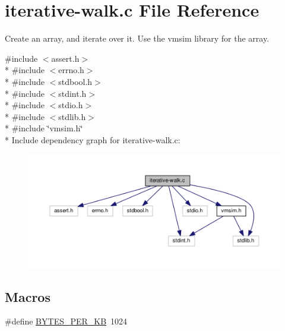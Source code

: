 \hypertarget{iterative-walk_8c}{\section{iterative-\/walk.c File Reference}
\label{iterative-walk_8c}
}


Create an array, and iterate over it. Use the {\ttfamily vmsim} library for the array.  


{\ttfamily \#include $<$assert.\+h$>$}\\*
{\ttfamily \#include $<$errno.\+h$>$}\\*
{\ttfamily \#include $<$stdbool.\+h$>$}\\*
{\ttfamily \#include $<$stdint.\+h$>$}\\*
{\ttfamily \#include $<$stdio.\+h$>$}\\*
{\ttfamily \#include $<$stdlib.\+h$>$}\\*
{\ttfamily \#include \char`\"{}vmsim.\+h\char`\"{}}\\*
Include dependency graph for iterative-\/walk.c\+:\nopagebreak
\begin{figure}[H]
\begin{center}
\leavevmode
\includegraphics[width=350pt]{iterative-walk_8c__incl}
\end{center}
\end{figure}
\subsection*{Macros}
\begin{DoxyCompactItemize}
\item 
\#define \hyperlink{iterative-walk_8c_ab5fde4a4261bca6820d8cd5b0d3a1b8d}{B\+Y\+T\+E\+S\+\_\+\+P\+E\+R\+\_\+\+K\+B}~1024
\end{DoxyCompactItemize}
